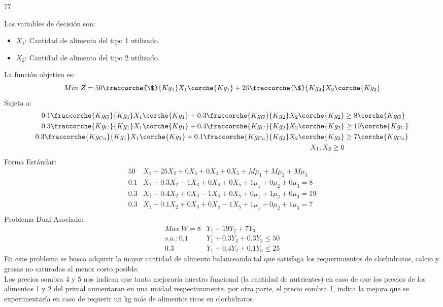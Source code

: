 77
\begin{homeworkProblem}
Las variables de decisión son:
\begin{itemize}
	\item $X_1$: Cantidad de alimento del tipo 1 utilizado.
	\item $X_2$: Cantidad de alimento del tipo 2 utilizado.
\end{itemize}
La función objetivo es: 
\begin{equation}
	Min\ Z = 50\fraccorche{\$}{Kg_1}X_1\corche{Kg_1} + 25\fraccorche{\$}{Kg_2}X_2\corche{Kg_2}
\end{equation}
Sujeta a:
\begin{align*}
	0.1\fraccorche{Kg_{G}}{Kg_1}X_1\corche{Kg_1} + 0.3\fraccorche{Kg_{G}}{Kg_2}X_2\corche{Kg_2} &\ge 8\corche{Kg_{G}} \\
	0.3\fraccorche{Kg_{C}}{Kg_1}X_1\corche{Kg_1} + 0.4\fraccorche{Kg_{C}}{Kg_2}X_2\corche{Kg_2} &\ge 19\corche{Kg_{C}} \\
	0.3\fraccorche{Kg_{Ca}}{Kg_1}X_1\corche{Kg_1} + 0.1\fraccorche{Kg_{Ca}}{Kg_2}X_2\corche{Kg_2} &\ge 7\corche{Kg_{Ca}} \\
	X_1,X_2 \ge 0 
\end{align*}
Forma Estándar:
\begin{align*}
50&X_1 + 25X_2 + 0X_3 + 0X_4 + 0X_5 + M\mu_1 + M\mu_2 + M\mu_3 \\
0.1&X_1 + 0.3X_2 -1X_3 + 0X_4 + 0X_5 + 1\mu_1 + 0\mu_2 + 0\mu_3 = 8\\
0.3&X_1 + 0.4X_2 +0X_3 -1X_4 + 0X_5 + 0\mu_1 + 1\mu_2 + 0\mu_3 = 19\\
0.3&X_1 + 0.1X_2  +0X_3 + 0X_4 - 1X_5 + 1\mu_1 + 0\mu_2 + 1\mu_3 = 7\\
\end{align*}
Problema Dual Asociado:
\begin{align*}
    Max\ W = 8&Y_1 + 19Y_2 + 7Y_3 \\
    s.a.: 0.1&Y_1 + 0.3Y_3 + 0.3Y_3 \le 50 \\
    0.3&Y_1 + 0.4Y_2 + 0.1Y_3 \le 25 
\end{align*}
En este problema se busca adquirir la mayor cantidad de alimento balanceando tal que satisfaga los requerimientos de clorhidratos, calcio y grasas no saturadas al menor costo posible. \\
Los precios sombra 4 y 5 nos indican que tanto mejoraría nuestro funcional (la cantidad de nutrientes) en caso de que los precios de los alimentos 1 y 2 del primal aumentaran en una unidad respectivamente. por otra parte, el precio sombra 1, indica la mejora que se experimentaría en caso de requerir un kg más de alimentos ricos en clorhidratos.
\end{homeworkProblem}